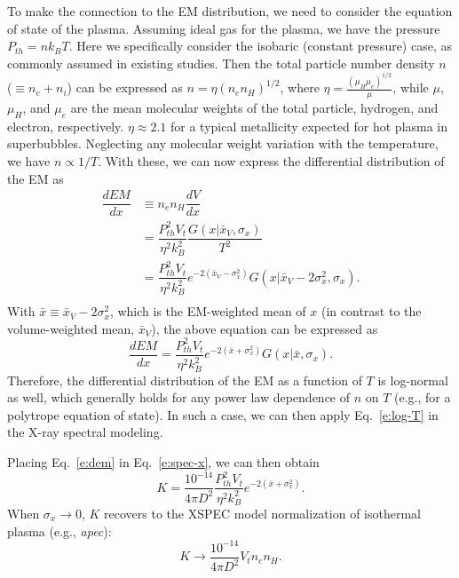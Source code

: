 \documentclass[usenatbib]{mnras}
\begin{document}
To make the connection to the EM distribution, we need to consider the equation of state of the plasma. Assuming ideal gas for the plasma, we have the pressure $P_{th}=nk_BT$. Here we specifically consider the isobaric (constant pressure) case, as commonly assumed in existing studies. Then the total particle number density $n$ ($\equiv n_e+n_i$) can be expressed as $n = \eta (n_en_H)^{1/2}$, where $\eta = \frac{(\mu_H \mu_e)^{1/2}}{\mu}$, while $\mu$, $\mu_H$, and $\mu_e$ are the mean molecular weights of the total particle, hydrogen, and electron, respectively. $\eta \approx 2.1$ for a typical metallicity expected for hot plasma in superbubbles. 
Neglecting any molecular weight variation with the temperature, we have $n \propto 1/T$. With these, we can now express the differential distribution of the EM as 
\begin{equation}
\begin{split}
\dfrac{d EM}{dx} & \equiv n_en_H \dfrac{dV}{dx} \\
& =\dfrac{P_{th}^2 V_t}{\eta^2 k_B^2} \dfrac{G(x|\bar{x}_V,\sigma_x)}{T^2} \\
& =\dfrac{P_{th}^2 V_t}{\eta^2 k_B^2} e^{-2(\bar{x}_V - \sigma_x^2)} G(x|\bar{x}_V-2\sigma_x^2,\sigma_x).\\
\label{e:em0}
\end{split}
\end{equation}
With $\bar{x} \equiv \bar{x}_V-2\sigma_x^2$, which is the EM-weighted mean of 
$x$ (in contrast to the volume-weighted mean, $\bar{x}_V$), 
the above equation can  be expressed as
\begin{equation}
\dfrac{d EM}{dx} = \dfrac{P_{th}^2 V_t}{\eta^2 k_B^2} e^{-2(\bar{x} + \sigma_x^2)} G(x|\bar{x},\sigma_x).
\label{e:dem}
\end{equation}
Therefore, the differential distribution of the EM as a function of $T$ is log-normal as well, which 
generally holds  for any power law dependence of $n$ on $T$ (e.g.,  for a polytrope equation of state). In such a case, we can then apply Eq.~\ref{e:log-T} in the X-ray spectral modeling.

Placing Eq.~\ref{e:dem} in Eq.~\ref{e:spec-x}, we can then obtain
\begin{equation}
K  = \dfrac{10^{-14}}{4\pi D^2}\dfrac{P_{th}^2 V_t}{\eta^2 k_B^2} e^{-2(\bar{x} + \sigma_x^2)}.
\label{e:norm}
\end{equation}
When $\sigma_x \rightarrow 0$, $K$ recovers to the XSPEC model normalization of isothermal plasma  (e.g., {\sl apec}):
\begin{equation}
K  \rightarrow \dfrac{10^{-14}}{4\pi D^2}V_t n_en_H.
\label{e:norm2}
\end{equation}
\end{document}
